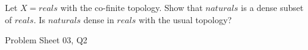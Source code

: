 \begin{samepage}
\begin{ex}
Let $X = reals$ with the co-finite topology. Show that $naturals$ is a dense subset of $reals$. Is $naturals$ dense in $reals$ with the usual topology?
\end{ex}
\begin{source}
Problem Sheet 03, Q2
\end{source}
\end{samepage}
